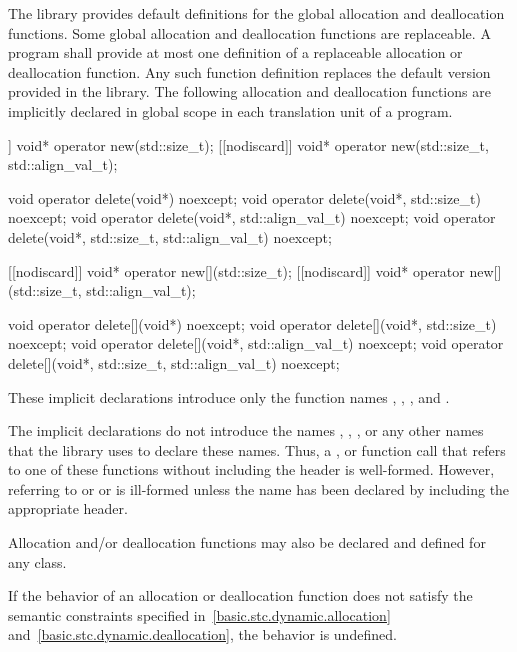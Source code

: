 \pnum
The library provides default definitions for the global allocation and
deallocation functions. Some global allocation and deallocation
functions are replaceable. A \Cpp{} program shall
provide at most one definition of a replaceable allocation or
deallocation function. Any such function definition replaces the default
version provided in the library. The
following allocation and deallocation functions
are implicitly declared in global scope in each translation unit of a
program.

\begin{codeblock}
[[nodiscard]] void* operator new(std::size_t);
[[nodiscard]] void* operator new(std::size_t, std::align_val_t);

void operator delete(void*) noexcept;
void operator delete(void*, std::size_t) noexcept;
void operator delete(void*, std::align_val_t) noexcept;
void operator delete(void*, std::size_t, std::align_val_t) noexcept;

[[nodiscard]] void* operator new[](std::size_t);
[[nodiscard]] void* operator new[](std::size_t, std::align_val_t);

void operator delete[](void*) noexcept;
void operator delete[](void*, std::size_t) noexcept;
void operator delete[](void*, std::align_val_t) noexcept;
void operator delete[](void*, std::size_t, std::align_val_t) noexcept;
\end{codeblock}

These implicit declarations introduce only the function names
 ,  ,
 , and 
.
\begin{note}
The implicit declarations do not introduce
the names ,
,
,
or any other names that the library uses to
declare these names. Thus, a ,
 or function call that refers to one of
these functions without including the header  is
well-formed. However, referring to 
or 
or 
is ill-formed unless the name has been declared
by including the appropriate header.
\end{note}
Allocation and/or
deallocation functions may also be declared and defined for any
class.

\pnum
If the behavior of an allocation or deallocation function
does not satisfy the semantic constraints
specified in~\ref{basic.stc.dynamic.allocation}
and~\ref{basic.stc.dynamic.deallocation},
the behavior is undefined.

